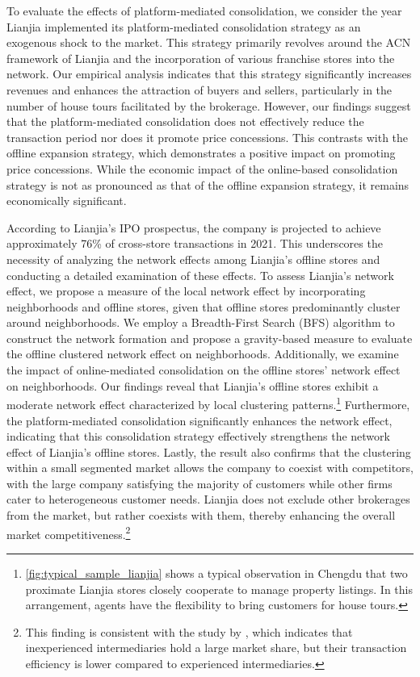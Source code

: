 \documentclass[11pt]{article}
\begin{document}
To evaluate the effects of platform-mediated consolidation, we consider the year Lianjia implemented its platform-mediated consolidation strategy as an exogenous shock to the market. This strategy primarily revolves around the ACN framework of Lianjia and the incorporation of various franchise stores into the network. Our empirical analysis indicates that this strategy significantly increases revenues and enhances the attraction of buyers and sellers, particularly in the number of house tours facilitated by the brokerage. However, our findings suggest that the platform-mediated consolidation does not effectively reduce the transaction period nor does it promote price concessions. This contrasts with the offline expansion strategy, which demonstrates a positive impact on promoting price concessions. While the economic impact of the online-based consolidation strategy is not as pronounced as that of the offline expansion strategy, it remains economically significant.

According to Lianjia's IPO prospectus, the company is projected to achieve approximately 76\% of cross-store transactions in 2021. This underscores the necessity of analyzing the network effects among Lianjia's offline stores and conducting a detailed examination of these effects. To assess Lianjia's network effect, we propose a measure of the local network effect by incorporating neighborhoods and offline stores, given that offline stores predominantly cluster around neighborhoods. We employ a Breadth-First Search (BFS) algorithm to construct the network formation and propose a gravity-based measure to evaluate the offline clustered network effect on neighborhoods. Additionally, we examine the impact of online-mediated consolidation on the offline stores' network effect on neighborhoods. Our findings reveal that Lianjia's offline stores exhibit a moderate network effect characterized by local clustering patterns.\footnote{\ref{fig:typical_sample_lianjia} shows a typical observation in Chengdu that two proximate Lianjia stores closely cooperate to manage property listings. In this arrangement, agents have the flexibility to bring customers for house tours.} Furthermore, the platform-mediated consolidation significantly enhances the network effect, indicating that this consolidation strategy effectively strengthens the network effect of Lianjia's offline stores. Lastly, the result also confirms that the clustering within a small segmented market allows the company to coexist with competitors, with the large company satisfying the majority of customers while other firms cater to heterogeneous customer needs. Lianjia does not exclude other brokerages from the market, but rather coexists with them, thereby enhancing the overall market competitiveness.\footnote{This finding is consistent with the study by \citep{gilbukh_goldsmith-pinkham_2019}, which indicates that inexperienced intermediaries hold a large market share, but their transaction efficiency is lower compared to experienced intermediaries.}
\end{document}
